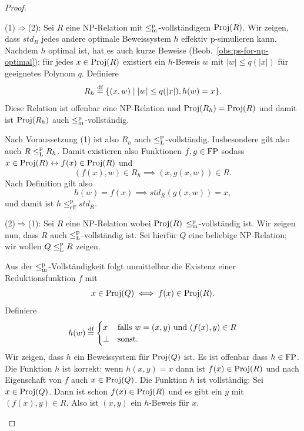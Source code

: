 \begin{proof}
    \begin{prooflist}[label={}]
    \item (1)$\Rightarrow$(2): 
        Sei $R$ eine NP-Relation mit $\leq_\mathrm{m}^\mathrm{p}$-vollständigem $\operatorname{Proj}(R)$.
    Wir zeigen, dass $\mathit{std}_{R}$ jedes andere optimale Beweissystem $h$ effektiv p-simulieren kann.
    Nachdem $h$ optimal ist, hat es auch kurze Beweise (Beob.~\ref{obs:ps-for-np-optimal}): für jedes $x\in\operatorname{Proj}(R)$ existiert ein $h$-Beweis $w$ mit $|w|\leq q(|x|)$ für geeignetes Polynom $q$.  Definiere
    \[ R_h \stackrel{\text{df}}{=} \{ (x, w) \mid |w|\leq q(|x|), h(w) = x\}. \]
    Diese Relation ist offenbar eine NP-Relation und $\operatorname{Proj}(R_h) = \operatorname{Proj}(R)$ und damit ist $\operatorname{Proj}(R_h)$ auch $\leq_\mathrm{m}^\mathrm{p}$-vollständig. 

    Nach Voraussetzung (1) ist also  $R_h$ auch $\leq_\mathrm{L}^\mathrm{p}$-vollständig.
    Insbesondere gilt also  auch $R \leq_\mathrm{L}^\mathrm{p} R_h$. Damit existieren also Funktionen $f,g\in\mathrm{FP}$ sodass
    $x\in \operatorname{Proj}(R) \leftrightarrow f(x)\in\operatorname{Proj}(R)$ und
    \[ (f(x), w) \in R_h \implies (x, g(x, w))\in R. \]
    Nach Definition gilt also 
    \[ h(w)=f(x) \implies \mathit{std}_R(g(x, w)) = x, \]
    und damit ist $h\leq^\mathrm p_\mathrm{eff} \mathit{std}_R$.

\item (2)$\Rightarrow$(1): 
    Sei $R$ eine NP-Relation wobei $\operatorname{Proj}(R)$ $\leq_\mathrm{m}^\mathrm{p}$-vollständig ist. Wir zeigen nun, dass $R$ auch $\leq_\mathrm{L}^\mathrm{p}$-vollständig ist.
    Sei hierfür $Q$ eine beliebige NP-Relation; wir wollen $Q\leq_\mathrm{L}^\mathrm{p} R$ zeigen.

    Aus der $\leq_\mathrm{m}^\mathrm{p}$-Vollständigkeit folgt unmittelbar die Existenz einer Reduktionsfunktion $f$ mit 
    \[ x\in \operatorname{Proj}(Q) \iff f(x) \in \operatorname{Proj}(R). \]
    Definiere
    \[ h(w) \stackrel{\text{df}}{=} \begin{cases} x & \text{falls $w=(x,y)$ und $(f(x),y)\in R$} \\ \bot & \text{sonst.} \end{cases} \]
    Wir zeigen, dass $h$ ein Beweissystem für $\operatorname{Proj}(Q)$ ist. Es ist offenbar dass $h\in\mathrm{FP}$. Die Funktion $h$ ist korrekt: wenn $h(x,y)=x$ dann ist $f(x)\in\operatorname{Proj}(R)$ und nach Eigenschaft von $f$ auch $x\in\operatorname{Proj}(Q)$.
    Die Funktion $h$ ist vollständig: Sei $x\in\operatorname{Proj}(Q)$. Dann ist schon $f(x)\in\operatorname{Proj}(R)$ und es gibt ein $y$ mit $(f(x),y)\in R$. Also ist $(x,y)$ ein $h$-Beweis für $x$.


\end{prooflist}
\end{proof}
